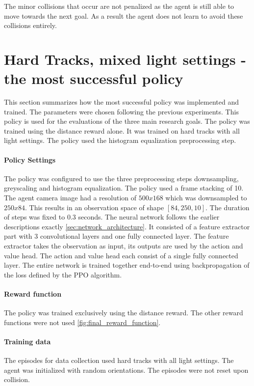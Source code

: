 The minor collisions that occur are not penalized as the agent is still able to move towards the next goal. As a result the agent does not learn to avoid these collisions entirely.


\section{Hard Tracks, mixed light settings - the most successful policy}
\label{sec:most_successful_policy}

This section summarizes how the most successful policy was implemented and trained. The parameters were chosen following the previous experiments. This policy is used for the evaluations of the three main research goals.
The policy was trained using the distance reward alone. It was trained on hard tracks with all light settings. The policy used the histogram equalization preprocessing step.

\paragraph{Policy Settings}
The policy was configured to use the three preprocessing steps downsampling, greyscaling and histogram equalization. The policy used a frame stacking of 10. The agent camera image had a resolution of $500x168$ which was downsampled to $250x84$. This results in an observation space of shape $[84, 250, 10]$. The duration of steps was fixed to $0.3$ seconds.
The neural network follows the earlier descriptions exactly \ref{sec:network_architecture}. It consisted of a feature extractor part with 3 convolutional layers and one fully connected layer. The feature extractor takes the observation as input, its outputs are used by the action and value head. The action and value head each consist of a single fully connected layer. The entire network is trained together end-to-end using backpropagation of the loss defined by the PPO algorithm.

\paragraph{Reward function}
The policy was trained exclusively using the distance reward. The other reward functions were not used \ref{fig:final_reward_function}.

\paragraph{Training data}
The episodes for data collection used hard tracks with all light settings. The agent was initialized with random orientations. The episodes were not reset upon collision.


